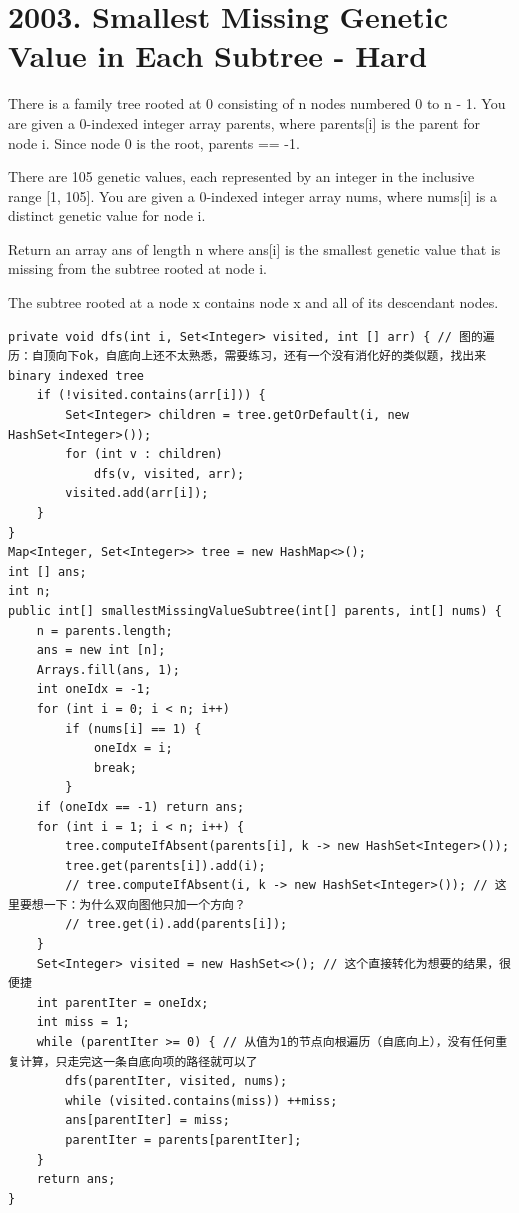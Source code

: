 \documentclass[9pt, b5paaper]{book}
\begin{document}
\section{2003. Smallest Missing Genetic Value in Each Subtree - Hard}
\label{sec-17-2}
There is a family tree rooted at 0 consisting of n nodes numbered 0 to n - 1. You are given a 0-indexed integer array parents, where parents[i] is the parent for node i. Since node 0 is the root, parents\footnotemark[2]{} == -1.

There are 105 genetic values, each represented by an integer in the inclusive range [1, 105]. You are given a 0-indexed integer array nums, where nums[i] is a distinct genetic value for node i.

Return an array ans of length n where ans[i] is the smallest genetic value that is missing from the subtree rooted at node i.

The subtree rooted at a node x contains node x and all of its descendant nodes.
\begin{verbatim}
private void dfs(int i, Set<Integer> visited, int [] arr) { // 图的遍历：自顶向下ok，自底向上还不太熟悉，需要练习，还有一个没有消化好的类似题，找出来binary indexed tree
    if (!visited.contains(arr[i])) {
        Set<Integer> children = tree.getOrDefault(i, new HashSet<Integer>());
        for (int v : children) 
            dfs(v, visited, arr);
        visited.add(arr[i]);
    }
}
Map<Integer, Set<Integer>> tree = new HashMap<>();
int [] ans;
int n;
public int[] smallestMissingValueSubtree(int[] parents, int[] nums) {
    n = parents.length;
    ans = new int [n];
    Arrays.fill(ans, 1); 
    int oneIdx = -1;
    for (int i = 0; i < n; i++) 
        if (nums[i] == 1) {
            oneIdx = i;
            break;
        }
    if (oneIdx == -1) return ans;
    for (int i = 1; i < n; i++) {
        tree.computeIfAbsent(parents[i], k -> new HashSet<Integer>());
        tree.get(parents[i]).add(i);
        // tree.computeIfAbsent(i, k -> new HashSet<Integer>()); // 这里要想一下：为什么双向图他只加一个方向？
        // tree.get(i).add(parents[i]);
    }
    Set<Integer> visited = new HashSet<>(); // 这个直接转化为想要的结果，很便捷
    int parentIter = oneIdx;
    int miss = 1;
    while (parentIter >= 0) { // 从值为1的节点向根遍历（自底向上），没有任何重复计算，只走完这一条自底向项的路径就可以了
        dfs(parentIter, visited, nums);
        while (visited.contains(miss)) ++miss;
        ans[parentIter] = miss;
        parentIter = parents[parentIter];
    }
    return ans;
}
\end{verbatim}
\end{document}
